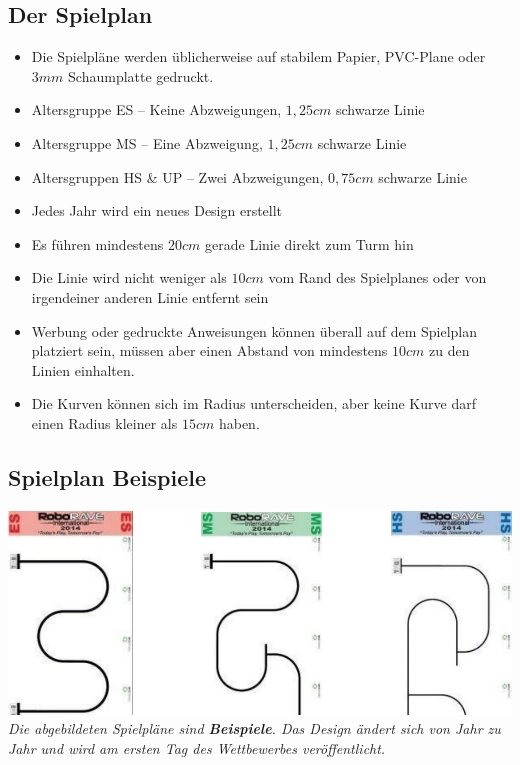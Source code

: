 \documentclass[a4paper,12pt]{article}
\begin{document}
\subsection{Der Spielplan}
\begin{itemize}
	\item Die Spielpläne werden üblicherweise auf stabilem Papier,
		PVC-Plane oder $3mm$ Schaumplatte gedruckt.
	\item Altersgruppe ES – Keine Abzweigungen, $1,25 cm$ schwarze Linie
	\item Altersgruppe MS – Eine Abzweigung, $1,25 cm$ schwarze Linie
	\item Altersgruppen HS \& UP – Zwei Abzweigungen, $0,75 cm$ schwarze
		Linie
	\item Jedes Jahr wird ein neues Design erstellt
	\item Es führen mindestens $20 cm$ gerade Linie direkt zum Turm hin
	\item Die Linie wird nicht weniger als $10 cm$ vom Rand des Spielplanes
		oder von irgendeiner anderen Linie entfernt sein
	\item Werbung oder gedruckte Anweisungen können überall auf dem
		Spielplan platziert sein, müssen aber einen Abstand von
		mindestens $10 cm$ zu den Linien einhalten.
	\item Die Kurven können sich im Radius unterscheiden, aber keine Kurve
		darf einen Radius kleiner als $15 cm$ haben.
\end{itemize}

\subsection{Spielplan Beispiele}
\includegraphics[width=1\textwidth]{images/tracks_lf.png}
\emph{Die abgebildeten Spielpläne sind \textbf{Beispiele}. Das Design ändert sich von Jahr zu
Jahr und wird am ersten Tag des Wettbewerbes veröffentlicht.}
\end{document}
